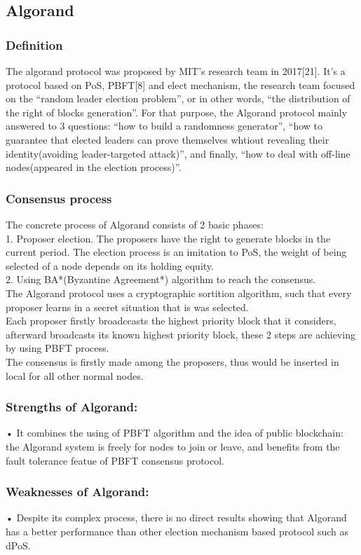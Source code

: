 \documentclass[doublespacing]{bmcart}
\begin{document}
\begin{CJK*}{UTF8}{gbsn}
	\subsection{Algorand}
	\subsubsection*{Definition}  
	The algorand protocol was proposed by MIT's research team in 2017[21]. It's a protocol based on PoS, PBFT[8] and elect mechanism, the research team focused on the ``random leader election problem'', or in other words, ``the distribution of the right of blocks generation''. For that purpose, the Algorand protocol mainly answered to 3 questions: ``how to build a randomness generator'', ``how to guarantee that elected leaders can prove themselves whtiout revealing their identity(avoiding leader-targeted attack)'', and finally, ``how to deal with off-line nodes(appeared in the election process)''.
	\subsubsection*{Consensus process}
	The concrete process of Algorand consists of 2 basic phases: 
	\\1. Proposer election. The proposers have the right to generate blocks in the current period. The election process is an imitation to PoS, the weight of being selected of a node depends on its holding equity.
	\\2. Using BA*(Byzantine Agreement*) algorithm to reach the consensus.
	\\The Algorand protocol uses a  cryptographic sortition algorithm, such that every proposer learns in a secret situation that is was selected.	
	\\Each proposer firstly broadccasts the highest priority block that it considers, afterward broadcasts its known highest priority block, these 2 steps are achieving by using PBFT process.
	\\The consensus is firstly made among the proposers, thus would be inserted in local for all other normal nodes. 
\subsubsection*{Strengths of Algorand:}	
• It combines the using of PBFT algorithm and the idea of public blockchain: the Algorand system is freely for nodes to join or leave, and benefits from the fault tolerance featue of PBFT consensus protocol.
\subsubsection*{Weaknesses of Algorand:}
• Despite its complex process, there is no direct results showing that Algorand has a better performance than other election mechanism based protocol such as dPoS.


\end{CJK*}
\end{document}
